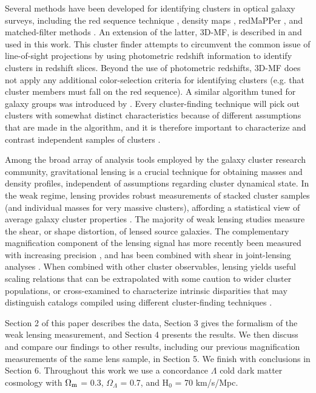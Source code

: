 Several methods have been developed for identifying clusters in optical galaxy surveys, including the red sequence technique \citep{Gladders00}, density maps \citep{Adami10}, redMaPPer \citep{Rykoff14}, and matched-filter methods \citep{Postman96}. An extension of the latter, \ac{3D-MF}, is described in \citet{Milkeraitis10} and used in this work. This cluster finder attempts to circumvent the common issue of line-of-sight projections by using photometric redshift information to identify clusters in redshift slices. Beyond the use of photometric redshifts, \ac{3D-MF} does not apply any additional color-selection criteria for identifying clusters (e.g. that cluster members must fall on the red sequence). A similar algorithm tuned for galaxy groups was introduced by \citet{Gillis11}. Every cluster-finding technique will pick out clusters with somewhat distinct characteristics because of different assumptions that are made in the algorithm, and it is therefore important to characterize and contrast independent samples of clusters \citep{Milkeraitis10}.

Among the broad array of analysis tools employed by the galaxy cluster research community, gravitational lensing is a crucial technique for obtaining masses and density profiles, independent of assumptions regarding cluster dynamical state. In the weak regime, lensing provides robust measurements of stacked cluster samples (and individual masses for very massive clusters), affording a statistical view of average galaxy cluster properties \citep{Hoekstra13}. The majority of weak lensing studies measure the shear, or shape distortion, of lensed source galaxies. The complementary magnification component of the lensing signal has more recently been measured with increasing precision \citep{Scranton05,Hildebrandt09b,Ford12,Ford14,Morrison12,Hildebrandt13,Bauer14}, and has been combined with shear in joint-lensing analyses \citep{Umetsu11,Umetsu14}. When combined with other cluster observables, lensing yields useful scaling relations that can be extrapolated with some caution to wider cluster populations, or cross-examined to characterize intrinsic disparities that may distinguish catalogs compiled using different cluster-finding techniques \citep{Hoekstra07,Johnston07,Leauthaud10,Hoekstra12,Covone14,Oguri14}.

Section 2 of this paper describes the data, Section 3 gives the formalism of the weak lensing measurement, and Section 4 presents the results. We then discuss and compare our findings to other results, including our previous magnification measurements of the same lens sample, in Section 5. We finish with conclusions in Section 6. Throughout this work we use a concordance $\Lambda$ cold dark matter cosmology with $\Omega_{\rm m}$ = 0.3, $\Omega_{\Lambda}$ = 0.7, and H$_0$ = 70 km/s/Mpc.

